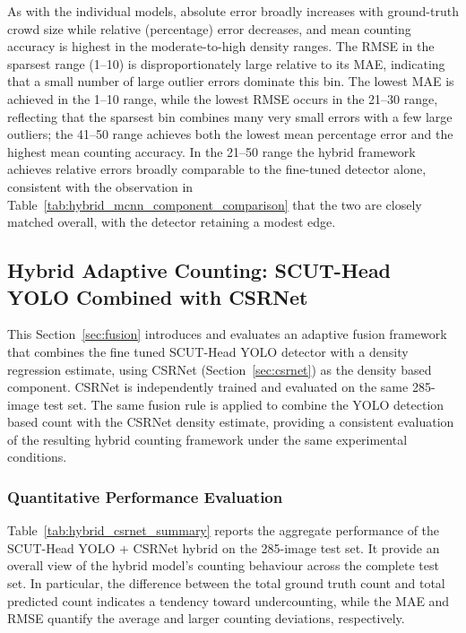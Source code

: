 \documentclass[12pt,a4paper]{report}
\begin{document}
As with the individual models, absolute error broadly increases with ground-truth crowd size while relative (percentage) error decreases, and mean counting accuracy is highest in the moderate-to-high density ranges. The RMSE in the sparsest range (1--10) is disproportionately large relative to its MAE, indicating that a small number of large outlier errors dominate this bin. The lowest MAE is achieved in the 1--10 range, while the lowest RMSE occurs in the 21--30 range, reflecting that the sparsest bin combines many very small errors with a few large outliers; the 41--50 range achieves both the lowest mean percentage error and the highest mean counting accuracy. In the 21--50 range the hybrid framework achieves relative errors broadly comparable to the fine-tuned detector alone, consistent with the observation in Table~\ref{tab:hybrid_mcnn_component_comparison} that the two are closely matched overall, with the detector retaining a modest edge.

\subsection{Hybrid Adaptive Counting: SCUT-Head YOLO Combined with CSRNet}
\label{sec:hybrid_csrnet}

This Section~\ref{sec:fusion} introduces and evaluates an adaptive fusion framework that combines the fine tuned SCUT-Head YOLO detector with a density regression estimate, using CSRNet (Section~\ref{sec:csrnet}) as the density based component. CSRNet is independently trained and evaluated on the same 285-image test set. The same fusion rule is applied to combine the YOLO detection based count with the CSRNet density estimate, providing a consistent evaluation of the resulting hybrid counting framework under the same experimental conditions.

\subsubsection{Quantitative Performance Evaluation}

Table~\ref{tab:hybrid_csrnet_summary} reports the aggregate performance of the SCUT-Head YOLO + CSRNet hybrid on the 285-image test set. It provide an overall view of the hybrid model's counting behaviour across the complete test set. In particular, the difference between the total ground truth count and total predicted count indicates a tendency toward undercounting, while the MAE and RMSE quantify the average and larger counting deviations, respectively. 
\end{document}

